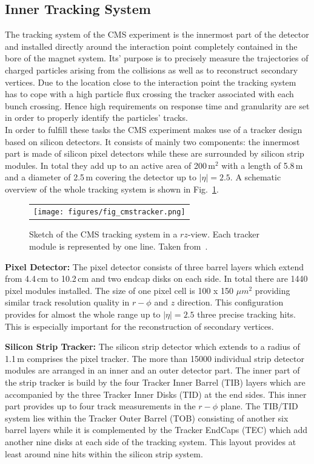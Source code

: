 \subsection{Inner Tracking System}
\label{subsec:cms_tracker}
The tracking system of the CMS experiment is the innermost part of the detector and installed directly around the interaction point completely contained in the bore of the magnet system. Its' purpose is to precisely measure the trajectories of charged particles arising from the collisions as well as to reconstruct secondary vertices. Due to the location close to the interaction point the tracking system has to cope with a high particle flux crossing the tracker associated with each bunch crossing. Hence high requirements on response time and granularity are set in order to properly identify the particles' tracks. \\
In order to fulfill these tasks the CMS experiment makes use of a tracker design based on silicon detectors. It consists of mainly two components: the innermost part is made of silicon pixel detectors while these are surrounded by silicon strip modules. In total they add up to an active area of 200\,$\mathrm{m}^2$ with a length of 5.8\,m and a diameter of 2.5\,m covering the detector up to $|\eta| = 2.5$. A schematic overview of the whole tracking system is shown in Fig.~\ref{fig:CMS_tracker}. 
\begin{figure}[!tp]
  \centering
  \begin{tabular}{c}
    \texttt{[image: figures/fig\_cmstracker.png]}
  \end{tabular}
  \caption{Sketch of the CMS tracking system in a $rz$-view. Each tracker module is represented by one line. Taken from~\cite{Chatrchyan:2008zzk}.}
  \label{fig:CMS_tracker}
\end{figure}
\begin{description}
 \item \textbf{Pixel Detector:} The pixel detector consists of three barrel layers which extend from 4.4\,cm to 10.2\,cm and two endcap disks on each side. In total there are 1440 pixel modules installed. The size of one pixel cell is 100 x 150 $\mu m^2$ providing similar track resolution quality in $r-\phi$ and $z$ direction. This configuration provides for almost the whole range up to $|\eta| = 2.5$ three precise tracking hits. This is especially important for the reconstruction of secondary vertices.
 \item \textbf{Silicon Strip Tracker:} The silicon strip detector which extends to a radius of 1.1\,m comprises the pixel tracker. The more than 15000 individual strip detector modules are arranged in an inner and an outer detector part. The inner part of the strip tracker is build by the four Tracker Inner Barrel (TIB) layers which are accompanied by the three Tracker Inner Disks (TID) at the end sides. This inner part provides up to four track measurements in the $r-\phi$ plane. The TIB/TID system lies within the Tracker Outer Barrel (TOB) consisting of another six barrel layers while it is complemented by the Tracker EndCaps (TEC) which add another nine disks at each side of the tracking system. This layout provides at least around nine hits within the silicon strip system. 
\end{description}
